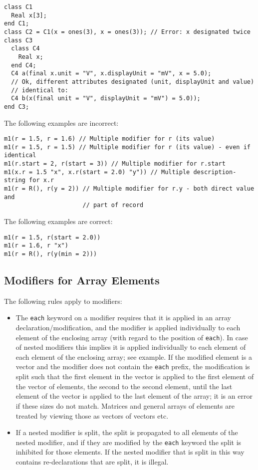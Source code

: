 \begin{example}
\begin{lstlisting}[language=modelica]
class C1
  Real x[3];
end C1;
class C2 = C1(x = ones(3), x = ones(3)); // Error: x designated twice
class C3
  class C4
    Real x;
  end C4;
  C4 a(final x.unit = "V", x.displayUnit = "mV", x = 5.0);
  // Ok, different attributes designated (unit, displayUnit and value)
  // identical to:
  C4 b(x(final unit = "V", displayUnit = "mV") = 5.0));
end C3;
\end{lstlisting}

The following examples are incorrect:
\begin{lstlisting}[language=modelica]
m1(r = 1.5, r = 1.6) // Multiple modifier for r (its value)
m1(r = 1.5, r = 1.5) // Multiple modifier for r (its value) - even if identical
m1(r.start = 2, r(start = 3)) // Multiple modifier for r.start
m1(x.r = 1.5 "x", x.r(start = 2.0) "y")) // Multiple description-string for x.r
m1(r = R(), r(y = 2)) // Multiple modifier for r.y - both direct value and
                      // part of record
\end{lstlisting}
The following examples are correct:
\begin{lstlisting}[language=modelica]
m1(r = 1.5, r(start = 2.0))
m1(r = 1.6, r "x")
m1(r = R(), r(y(min = 2)))
\end{lstlisting}
\end{example}

\subsection{Modifiers for Array Elements}\label{modifiers-for-array-elements}

The following rules apply to modifiers:
\begin{itemize}
\item
  The \lstinline!each! keyword on a modifier requires that it is applied in an array declaration/modification, and the modifier is applied individually to each element of the enclosing array (with regard to the position of \lstinline!each!).
  In case of nested modifiers this implies it is applied individually to each element of each element of the enclosing array; see example.
  If the modified element is a vector and the modifier does not contain the \lstinline!each! prefix, the modification is split such that the first element in the vector is applied to the first element of the vector of elements, the second to the second element, until the last element of the vector is applied to the last element of the array; it is an error if these sizes do not match.
  Matrices and general arrays of elements are treated by viewing those as vectors of vectors etc.
\item
  If a nested modifier is split, the split is propagated to all elements of the nested modifier, and if they are modified by the \lstinline!each! keyword the split is inhibited for those elements.
  If the nested modifier that is split in this way contains re-declarations that are split, it is illegal.
\end{itemize}

